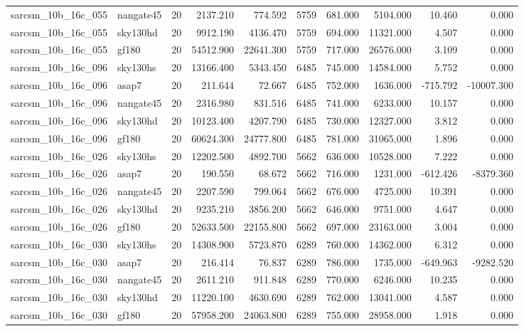 \begin{tabular}{llrrrrrrrr}
sarcsm\_10b\_16c\_055 & nangate45 & 20 & 2137.210 & 774.592 & 5759 & 681.000 & 5104.000 & 10.460 & 0.000 \\
sarcsm\_10b\_16c\_055 & sky130hd & 20 & 9912.190 & 4136.470 & 5759 & 694.000 & 11321.000 & 4.507 & 0.000 \\
sarcsm\_10b\_16c\_055 & gf180 & 20 & 54512.900 & 22641.300 & 5759 & 717.000 & 26576.000 & 3.109 & 0.000 \\
sarcsm\_10b\_16c\_096 & sky130hs & 20 & 13166.400 & 5343.450 & 6485 & 745.000 & 14584.000 & 5.752 & 0.000 \\
sarcsm\_10b\_16c\_096 & asap7 & 20 & 211.644 & 72.667 & 6485 & 752.000 & 1636.000 & -715.792 & -10007.300 \\
sarcsm\_10b\_16c\_096 & nangate45 & 20 & 2316.980 & 831.516 & 6485 & 741.000 & 6233.000 & 10.157 & 0.000 \\
sarcsm\_10b\_16c\_096 & sky130hd & 20 & 10123.400 & 4207.790 & 6485 & 730.000 & 12327.000 & 3.812 & 0.000 \\
sarcsm\_10b\_16c\_096 & gf180 & 20 & 60624.300 & 24777.800 & 6485 & 781.000 & 31065.000 & 1.896 & 0.000 \\
sarcsm\_10b\_16c\_026 & sky130hs & 20 & 12202.500 & 4892.700 & 5662 & 636.000 & 10528.000 & 7.222 & 0.000 \\
sarcsm\_10b\_16c\_026 & asap7 & 20 & 190.550 & 68.672 & 5662 & 716.000 & 1231.000 & -612.426 & -8379.360 \\
sarcsm\_10b\_16c\_026 & nangate45 & 20 & 2207.590 & 799.064 & 5662 & 676.000 & 4725.000 & 10.391 & 0.000 \\
sarcsm\_10b\_16c\_026 & sky130hd & 20 & 9235.210 & 3856.200 & 5662 & 646.000 & 9751.000 & 4.647 & 0.000 \\
sarcsm\_10b\_16c\_026 & gf180 & 20 & 52633.500 & 22155.800 & 5662 & 697.000 & 23163.000 & 3.004 & 0.000 \\
sarcsm\_10b\_16c\_030 & sky130hs & 20 & 14308.900 & 5723.870 & 6289 & 760.000 & 14362.000 & 6.312 & 0.000 \\
sarcsm\_10b\_16c\_030 & asap7 & 20 & 216.414 & 76.837 & 6289 & 786.000 & 1735.000 & -649.963 & -9282.520 \\
sarcsm\_10b\_16c\_030 & nangate45 & 20 & 2611.210 & 911.848 & 6289 & 770.000 & 6246.000 & 10.235 & 0.000 \\
sarcsm\_10b\_16c\_030 & sky130hd & 20 & 11220.100 & 4630.690 & 6289 & 762.000 & 13041.000 & 4.587 & 0.000 \\
sarcsm\_10b\_16c\_030 & gf180 & 20 & 57958.200 & 24063.800 & 6289 & 755.000 & 28958.000 & 1.918 & 0.000 \\

\end{tabular}
